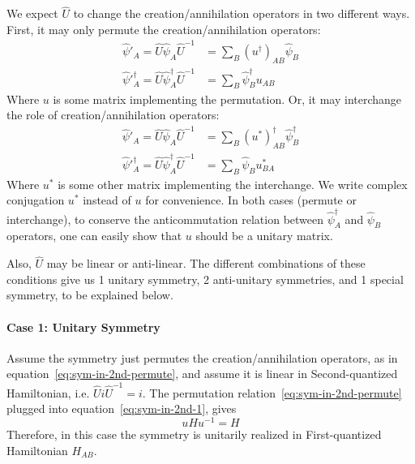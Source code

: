 \documentclass{article}
\begin{document}
We expect $\hat{U}$ to change the creation/annihilation operators in two different
ways. First, it may only permute the creation/annihilation operators:
\begin{subequations}
\label{eq:sym-in-2nd-permute}
\begin{align}
    \label{eq:sym-in-2nd-permute-1}
    \hat{\psi}'_A = 
    \hat{U} \hat\psi_A \hat{U}^{-1} &=
    \sum_B (u^\dagger)_{AB} \hat\psi_B \\
    \label{eq:sym-in-2nd-permute-2}
    \hat\psi'^\dagger_A =
    \hat{U} \hat\psi^\dagger_A \hat{U}^{-1} &= 
    \sum_B  \hat\psi^\dagger_B u_{AB}
\end{align}
\end{subequations}
Where $u$ is some matrix implementing the permutation.
Or, it may interchange the role of creation/annihilation operators:
\begin{subequations}
\label{eq:sym-cc}
\begin{align}
    \label{eq:sym-cc-1}
    \hat{\psi}'_A = 
    \hat{U} \hat\psi_A \hat{U}^{-1} &=
    \sum_B (u^*)^\dagger_{AB} \hat\psi^\dagger_B \\
    \label{eq:sym-cc-2}
    \hat\psi'^\dagger_A =
    \hat{U} \hat\psi^\dagger_A \hat{U}^{-1} &= 
    \sum_B  \hat\psi_B u^*_{BA}
\end{align}
\end{subequations}
Where $u^*$ is some other matrix implementing the interchange. We write complex
conjugation $u^*$ instead of $u$ for convenience. In both cases (permute or
interchange), to conserve the anticommutation relation between
$\hat\psi^\dagger_A$ and $\hat\psi_B$ operators, one can easily show that $u$
should be a unitary matrix.

Also, $\hat{U}$ may be linear or anti-linear. The different combinations of these
conditions give us 1 unitary symmetry, 2 anti-unitary symmetries, and 1 special
symmetry, to be explained below.

\paragraph{Case 1: Unitary Symmetry}

Assume the symmetry just permutes the creation/annihilation operators, as in
equation~\ref{eq:sym-in-2nd-permute}, and assume it is linear in
Second-quantized Hamiltonian, i.e. $\hat{U}i\hat{U}^{-1}=i$. The permutation
relation~\ref{eq:sym-in-2nd-permute} plugged into
equation~\ref{eq:sym-in-2nd-1}, gives
\begin{equation}
    u H u^{-1} = H
\end{equation}
Therefore, in this case the symmetry is unitarily realized in First-quantized
Hamiltonian $H_{AB}$.
\end{document}
